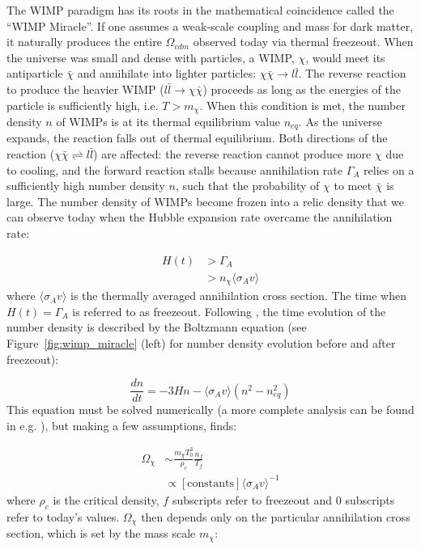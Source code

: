 The \ac{WIMP} paradigm has its roots in the mathematical coincidence called the ``\ac{WIMP} Miracle''. If one assumes a weak-scale coupling and mass for dark matter, it naturally produces the entire $\Omega_{cdm}$ observed today via thermal freezeout. When the universe was small and dense with particles, a \ac{WIMP}, $\chi$, would meet its antiparticle $\bar{\chi}$ and annihilate into lighter particles: $\chi \bar{\chi} \rightarrow l \bar{l}$. The reverse reaction to produce the heavier \ac{WIMP} ($ l \bar{l} \rightarrow \chi \bar{\chi} $) proceeds as long as the energies of the particle is sufficiently high, i.e. $T > m_{\chi}$. When this condition is met, the number density $n$ of \ac{WIMP}s is at its thermal equilibrium value $n_{eq}$. As the universe expands, the reaction falls out of thermal equilibrium. Both directions of the reaction ($\chi \bar{\chi} \rightleftharpoons l \bar{l}$) are affected: the reverse reaction cannot produce more $\chi$ due to cooling, and the forward reaction stalls because annihilation rate $\Gamma_{A}$ relies on a sufficiently high number density $n$, such that the probability of $\chi$ to meet $\bar{\chi}$ is large. The number density of \ac{WIMP}s become frozen into a relic density that we can observe today when the Hubble expansion rate overcame the annihilation rate:

\begin{equation}
\begin{split}
H(t) &> \Gamma_{A} \\
 &> n_{\chi} \langle \sigma_{A} v \rangle
\end{split}
\end{equation}
where $\langle \sigma_{A} v \rangle$ is the thermally averaged annihilation cross section. The time when $H(t) = \Gamma_{A}$ is referred to as freezeout. Following \cite{Feng2010}, the time evolution of the number density is described by the Boltzmann equation (see Figure~\ref{fig:wimp_miracle} (left) for number density evolution before and after freezeout):

\begin{equation}
\frac{dn}{dt} = -3 H n - \langle \sigma_{A}v \rangle (n^{2} - n_{eq}^{2} )
\end{equation}
This equation must be solved numerically (a more complete analysis can be found in e.g. \cite{Lisanti2016}), but making a few assumptions, \cite{Feng2010} finds:

\begin{equation}
\begin{split}
\Omega_{\chi} &\sim \frac{m_{\chi} T_{0}^{3}}{ \rho_{c}} \frac{n_{f}}{T_{f}} \\ %
&\propto [\mathrm{constants}] \langle \sigma_{A}v \rangle^{-1} 
\end{split}
\end{equation}
where $\rho_{c}$ is the critical density, $f$ subscripts refer to freezeout and $0$ subscripts refer to today's values. $\Omega_{\chi}$ then depends only on the particular annihilation cross section, which is set by the mass scale $m_{\chi}$:

